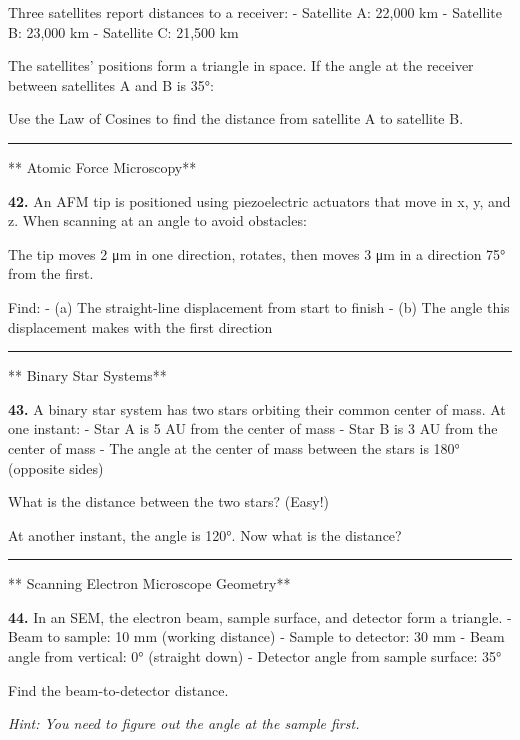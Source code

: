 \documentclass[
  11pt,
]{article}
\begin{document}
Three satellites report distances to a receiver: - Satellite A: 22,000
km - Satellite B: 23,000 km - Satellite C: 21,500 km

The satellites' positions form a triangle in space. If the angle at the
receiver between satellites A and B is 35°:

Use the Law of Cosines to find the distance from satellite A to
satellite B.

\begin{center}\rule{0.5\linewidth}{0.5pt}\end{center}

** Atomic Force Microscopy**

\textbf{42.} An AFM tip is positioned using piezoelectric actuators that
move in x, y, and z. When scanning at an angle to avoid obstacles:

The tip moves 2 μm in one direction, rotates, then moves 3 μm in a
direction 75° from the first.

Find: - (a) The straight-line displacement from start to finish - (b)
The angle this displacement makes with the first direction

\begin{center}\rule{0.5\linewidth}{0.5pt}\end{center}

** Binary Star Systems**

\textbf{43.} A binary star system has two stars orbiting their common
center of mass. At one instant: - Star A is 5 AU from the center of mass
- Star B is 3 AU from the center of mass - The angle at the center of
mass between the stars is 180° (opposite sides)

What is the distance between the two stars? (Easy!)

At another instant, the angle is 120°. Now what is the distance?

\begin{center}\rule{0.5\linewidth}{0.5pt}\end{center}

** Scanning Electron Microscope Geometry**

\textbf{44.} In an SEM, the electron beam, sample surface, and detector
form a triangle. - Beam to sample: 10 mm (working distance) - Sample to
detector: 30 mm - Beam angle from vertical: 0° (straight down) -
Detector angle from sample surface: 35°

Find the beam-to-detector distance.

\emph{Hint: You need to figure out the angle at the sample first.}
\end{document}
